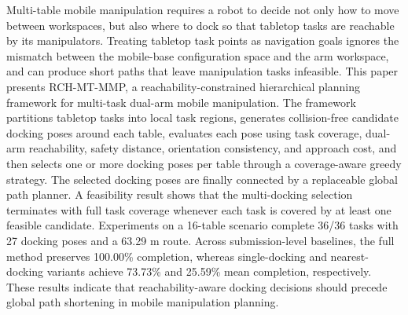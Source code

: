 Multi-table mobile manipulation requires a robot to decide not only how to move between workspaces, but also where to dock so that tabletop tasks are reachable by its manipulators. Treating tabletop task points as navigation goals ignores the mismatch between the mobile-base configuration space and the arm workspace, and can produce short paths that leave manipulation tasks infeasible. This paper presents RCH-MT-MMP, a reachability-constrained hierarchical planning framework for multi-task dual-arm mobile manipulation. The framework partitions tabletop tasks into local task regions, generates collision-free candidate docking poses around each table, evaluates each pose using task coverage, dual-arm reachability, safety distance, orientation consistency, and approach cost, and then selects one or more docking poses per table through a coverage-aware greedy strategy. The selected docking poses are finally connected by a replaceable global path planner. A feasibility result shows that the multi-docking selection terminates with full task coverage whenever each task is covered by at least one feasible candidate. Experiments on a 16-table scenario complete 36/36 tasks with 27 docking poses and a 63.29 m route. Across submission-level baselines, the full method preserves 100.00\% completion, whereas single-docking and nearest-docking variants achieve 73.73\% and 25.59\% mean completion, respectively. These results indicate that reachability-aware docking decisions should precede global path shortening in mobile manipulation planning.
